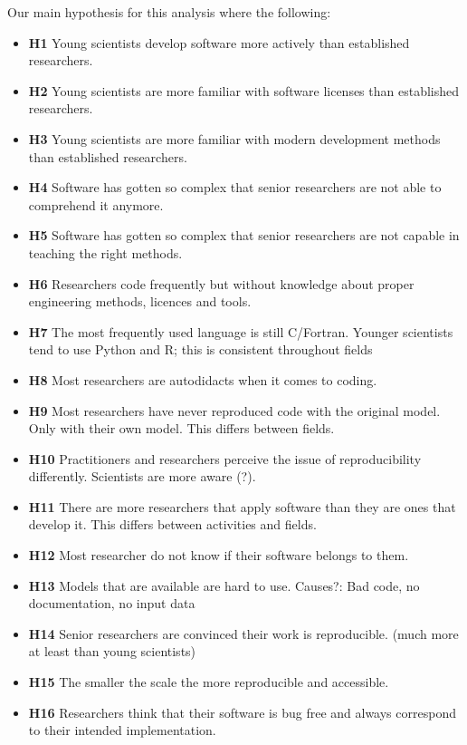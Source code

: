 \documentclass{article}
\begin{document}
Our main hypothesis for this analysis where the following:
\begin{itemize}
	\item \textbf{H1} Young scientists develop software more actively than established researchers.
	\item \textbf{H2} Young scientists are more familiar with software licenses than established researchers. 
	\item \textbf{H3} Young scientists are more familiar with modern development methods than established researchers. 
	\item \textbf{H4} Software has gotten so complex that senior researchers are not able to comprehend it anymore. 
 	\item \textbf{H5} Software has gotten so complex that senior researchers are not capable in teaching the right methods.
 	\item \textbf{H6} Researchers code frequently but without knowledge about proper engineering methods, licences and tools. 
 	\item \textbf{H7} The most frequently used language is still C/Fortran. Younger scientists tend to use Python and R; this is consistent throughout fields 
 	\item \textbf{H8} Most researchers are autodidacts when it comes to coding. 
 	\item \textbf{H9} Most researchers have never reproduced code with the original model. Only with their own model. This differs between fields. 
 	\item \textbf{H10} Practitioners and researchers perceive the issue of reproducibility differently. Scientists are more aware (?). 
	\item \textbf{H11} There are more researchers that apply software than they are ones that develop it. This differs between activities and fields. 
 	\item \textbf{H12} Most researcher do not know if their software belongs to them. 
 	\item \textbf{H13} Models that are available are hard to use. Causes?: Bad code, no documentation, no input data 
 	\item \textbf{H14} Senior researchers are convinced their work is reproducible. (much more at least than young scientists) 
 	\item \textbf{H15} The smaller the scale the more reproducible and accessible. 
 	\item \textbf{H16} Researchers think that their software is bug free and always correspond to their intended implementation. 

\end{itemize}
\end{document}

